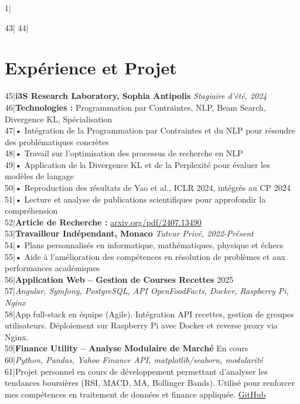 1|\documentclass[a4paper,10pt]{article}
\begin{document}
43|
44|\section*{Expérience et Projet}
45|\textbf{i3S Research Laboratory, Sophia Antipolis} \hfill \textit{Stagiaire d'été, 2024}\\
46|\textbf{Technologies :} Programmation par Contraintes, NLP, Beam Search, Divergence KL, Spécialisation\\
47|• Intégration de la Programmation par Contraintes et du NLP pour résoudre des problématiques concrètes\\
48|• Travail sur l’optimisation des processus de recherche en NLP\\
49|• Application de la Divergence KL et de la Perplexité pour évaluer les modèles de langage\\
50|• Reproduction des résultats de Yao et al., ICLR 2024, intégrés au CP 2024\\
51|• Lecture et analyse de publications scientifiques pour approfondir la compréhension\\
52|\textbf{Article de Recherche :} \href{https://arxiv.org/pdf/2407.13490}{arxiv.org/pdf/2407.13490}\\
53|\textbf{Travailleur Indépendant, Monaco} \hfill \textit{Tuteur Privé, 2022-Présent}\\
54|• Plans personnalisés en informatique, mathématiques, physique et échecs\\
55|• Aide à l’amélioration des compétences en résolution de problèmes et aux performances académiques\\
56|\textbf{Application Web – Gestion de Courses  Recettes} \hfill 2025 \\
57|\textit{Angular, Symfony, PostgreSQL, API OpenFoodFacts, Docker, Raspberry Pi, Nginx} \\
58|App full-stack en équipe (Agile). Intégration API recettes, gestion de groupes utilisateurs. Déploiement sur Raspberry Pi avec Docker et reverse proxy via Nginx.\\
59|\textbf{Finance Utility – Analyse Modulaire de Marché} \hfill En cours \\
60|\textit{Python, Pandas, Yahoo Finance API, matplotlib/seaborn, modularité} \\
61|Projet personnel en cours de développement permettant d’analyser les tendances boursières (RSI, MACD, MA, Bollinger Bands). Utilisé pour renforcer mes compétences en traitement de données et finance appliquée. \href{https://github.com/TerminalGambit/PersonalStockTrackerAnalyser}{GitHub} \\
\end{document}
